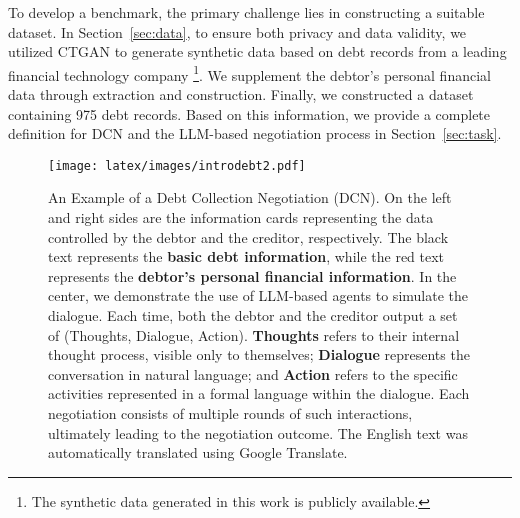 
To develop a benchmark, the primary challenge lies in constructing a suitable dataset. In Section~\ref{sec:data}, to ensure both privacy and data validity, we utilized CTGAN \citep{ctgan} to generate synthetic data based on debt records from a leading financial technology company \footnote{The synthetic data generated in this work is publicly available.}. 
We supplement the debtor’s personal financial data through extraction and construction. Finally, we constructed a dataset containing 975 debt records. Based on this information, we provide a complete definition for DCN and the LLM-based negotiation process in Section~\ref{sec:task}.


\begin{figure*}[htbp]
\vspace{-0.1in}
  \centering
  \texttt{[image: latex/images/introdebt2.pdf]}  
  \vspace{-0.15in}
  \caption{
An Example of a Debt Collection Negotiation (DCN). On the left and right sides are the information cards representing the data controlled by the debtor and the creditor, respectively. The black text represents the \textbf{basic debt information}, while the red text represents the \textbf{debtor’s personal financial information}. In the center, we demonstrate the use of LLM-based agents to simulate the dialogue. Each time, both the debtor and the creditor output a set of (Thoughts, Dialogue, Action). \textcolor[RGB]{184,96,41}{\textbf{Thoughts}} refers to their internal thought process, visible only to themselves; \textbf{Dialogue} represents the conversation in natural language; and \textcolor[RGB]{56,84,146}{\textbf{Action}} refers to the specific activities represented in a formal language within the dialogue. Each negotiation consists of multiple rounds of such interactions, ultimately leading to the negotiation outcome. The English text was automatically translated using Google Translate.}
\vspace{-0.1in}
\label{img:pipeline}
\end{figure*}


